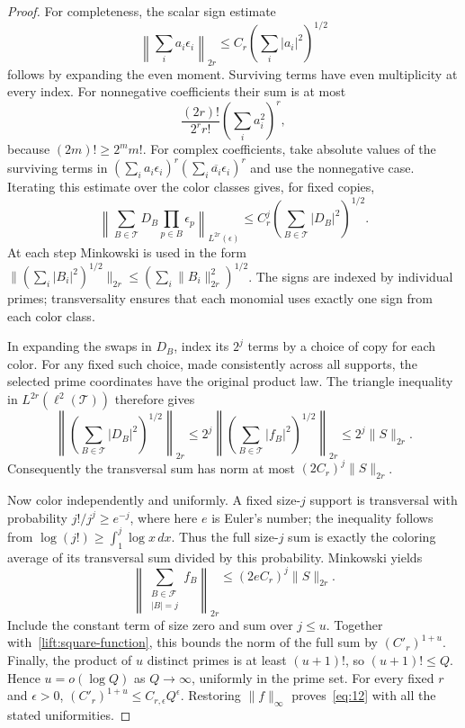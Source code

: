 \begin{proof}
For completeness, the scalar sign estimate
\[
 \left\|\sum_i a_i\epsilon_i\right\|_{2r}
 \le C_r\left(\sum_i|a_i|^2\right)^{1/2}
\]
follows by expanding the even moment.  Surviving terms have even
multiplicity at every index.  For nonnegative coefficients their sum is
at most
\[
 \frac{(2r)!}{2^r r!}\left(\sum_i a_i^2\right)^r,
\]
because \((2m)!\ge2^m m!\).  For complex coefficients, take absolute
values of the surviving terms in
\((\sum_i a_i\epsilon_i)^r(\sum_i\overline{a_i}\epsilon_i)^r\)
and use the nonnegative case.  Iterating this estimate over the color
classes gives, for fixed copies,
\[
 \left\|\sum_{B\in\mathcal T}D_B\prod_{p\in B}\epsilon_p
       \right\|_{L^{2r}(\epsilon)}
 \le C_r^j\left(\sum_{B\in\mathcal T}|D_B|^2\right)^{1/2}.
\]
At each step Minkowski is used in the form
\(\| (\sum_i|B_i|^2)^{1/2}\|_{2r}
\le(\sum_i\|B_i\|_{2r}^2)^{1/2}\).
The signs are indexed by individual primes; transversality ensures that
each monomial uses exactly one sign from each color class.

In expanding the swaps in \(D_B\), index its \(2^j\) terms by a choice
of copy for each color.  For any fixed such choice, made consistently
across all supports, the selected prime coordinates have the original
product law.  The triangle inequality in
\(L^{2r}(\ell^2(\mathcal T))\) therefore gives
\[
 \left\|\left(\sum_{B\in\mathcal T}|D_B|^2\right)^{1/2}\right\|_{2r}
 \le2^j\left\|\left(\sum_{B\in\mathcal T}|f_B|^2\right)^{1/2}
       \right\|_{2r}
 \le2^j\|S\|_{2r}.
\]
Consequently the transversal sum has norm at most
\((2C_r)^j\|S\|_{2r}\).

Now color independently and uniformly.  A fixed size-\(j\) support is
transversal with probability \(j!/j^j\ge e^{-j}\), where here \(e\)
is Euler's number; the inequality follows from
\(\log(j!)\ge\int_1^j\log x\,dx\).
Thus the full size-\(j\) sum is exactly the coloring average of its
transversal sum divided by this probability.  Minkowski yields
\[
 \left\|\sum_{\substack{B\in\mathcal F\\|B|=j}}f_B\right\|_{2r}
 \le(2eC_r)^j\|S\|_{2r}.
\]
Include the constant term of size zero and sum over \(j\le u\).
Together with~\eqref{lift:square-function}, this bounds the norm of
the full sum by \((C'_r)^{1+u}\).
Finally, the product of \(u\) distinct primes is at least \((u+1)!\),
so \((u+1)!\le Q\).  Hence \(u=o(\log Q)\) as \(Q\to\infty\),
uniformly in the prime set.  For every fixed \(r\) and \(\epsilon>0\),
\((C'_r)^{1+u}\le C_{r,\epsilon}Q^\epsilon\).
Restoring \(\|f\|_\infty\) proves~\eqref{eq:12} with all the stated
uniformities.
\end{proof}

